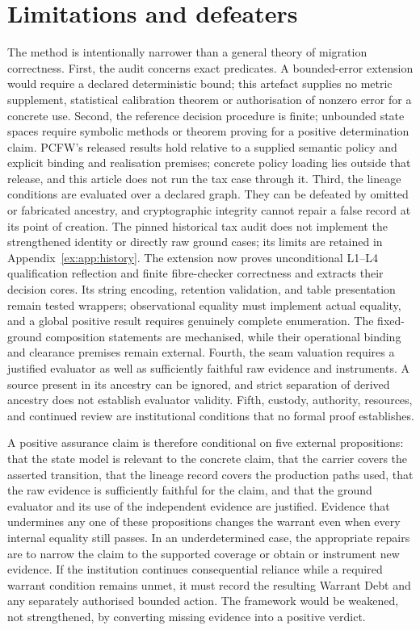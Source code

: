 \documentclass[11pt]{article}
\theoremstyle{definition}
\begin{document}
\section{Limitations and defeaters}\label{ex:sec:limitations}
The method is intentionally narrower than a general theory of migration correctness. First, the audit concerns exact predicates. A bounded-error extension would require a declared deterministic bound; this artefact supplies no metric supplement, statistical calibration theorem or authorisation of nonzero error for a concrete use. Second, the reference decision procedure is finite; unbounded state spaces require symbolic methods or theorem proving for a positive determination claim. PCFW's released results hold relative to a supplied semantic policy and explicit binding and realisation premises; concrete policy loading lies outside that release, and this article does not run the tax case through it. Third, the lineage conditions are evaluated over a declared graph. They can be defeated by omitted or fabricated ancestry, and cryptographic integrity cannot repair a false record at its point of creation. The pinned historical tax audit does not implement the strengthened identity or directly raw ground cases; its limits are retained in Appendix~\ref{ex:app:history}. The extension now proves unconditional L1--L4 qualification reflection and finite fibre-checker correctness and extracts their decision cores. Its string encoding, retention validation, and table presentation remain tested wrappers; observational equality must implement actual equality, and a global positive result requires genuinely complete enumeration. The fixed-ground composition statements are mechanised, while their operational binding and clearance premises remain external. Fourth, the seam valuation requires a justified evaluator as well as sufficiently faithful raw evidence and instruments. A source present in its ancestry can be ignored, and strict separation of derived ancestry does not establish evaluator validity. Fifth, custody, authority, resources, and continued review are institutional conditions that no formal proof establishes.

A positive assurance claim is therefore conditional on five external propositions: that the state model is relevant to the concrete claim, that the carrier covers the asserted transition, that the lineage record covers the production paths used, that the raw evidence is sufficiently faithful for the claim, and that the ground evaluator and its use of the independent evidence are justified. Evidence that undermines any one of these propositions changes the warrant even when every internal equality still passes. In an underdetermined case, the appropriate repairs are to narrow the claim to the supported coverage or obtain or instrument new evidence. If the institution continues consequential reliance while a required warrant condition remains unmet, it must record the resulting Warrant Debt and any separately authorised bounded action. The framework would be weakened, not strengthened, by converting missing evidence into a positive verdict.
\end{document}
